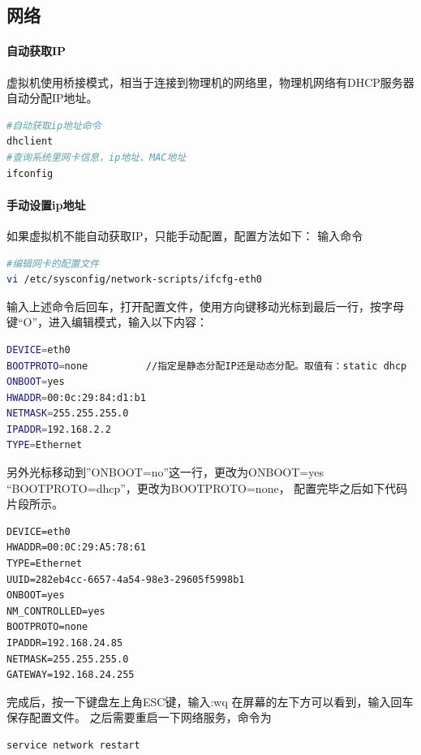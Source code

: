 \documentclass{book}
\begin{document}
\subsection{网络}

\paragraph{自动获取IP}
虚拟机使用桥接模式，相当于连接到物理机的网络里，物理机网络有DHCP服务器自动分配IP地址。

\begin{lstlisting}[language=Bash]
#自动获取ip地址命令
dhclient 
#查询系统里网卡信息，ip地址、MAC地址
ifconfig 
\end{lstlisting}

\paragraph{手动设置ip地址}

如果虚拟机不能自动获取IP，只能手动配置，配置方法如下：
输入命令

\begin{lstlisting}[language=Bash]
#编辑网卡的配置文件
vi /etc/sysconfig/network-scripts/ifcfg-eth0
\end{lstlisting}

输入上述命令后回车，打开配置文件，使用方向键移动光标到最后一行，按字母键“O”，进入编辑模式，输入以下内容：

\begin{lstlisting}[language=Bash]
DEVICE=eth0
BOOTPROTO=none          //指定是静态分配IP还是动态分配。取值有：static dhcp
ONBOOT=yes
HWADDR=00:0c:29:84:d1:b1
NETMASK=255.255.255.0
IPADDR=192.168.2.2
TYPE=Ethernet
\end{lstlisting}

另外光标移动到”ONBOOT=no”这一行，更改为ONBOOT=yes
“BOOTPROTO=dhcp”，更改为BOOTPROTO=none，
配置完毕之后如下代码片段所示。

\begin{lstlisting}
DEVICE=eth0
HWADDR=00:0C:29:A5:78:61
TYPE=Ethernet
UUID=282eb4cc-6657-4a54-98e3-29605f5998b1
ONBOOT=yes
NM_CONTROLLED=yes
BOOTPROTO=none
IPADDR=192.168.24.85
NETMASK=255.255.255.0
GATEWAY=192.168.24.255
\end{lstlisting}

完成后，按一下键盘左上角ESC键，输入:wq 在屏幕的左下方可以看到，输入回车保存配置文件。
之后需要重启一下网络服务，命令为

\begin{lstlisting}[language=Bash]
service network restart
\end{lstlisting}
\end{document}
